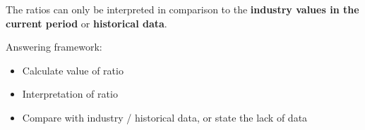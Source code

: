The ratios can only be interpreted in comparison to the \textbf{industry values in the current period} or \textbf{historical data}.

Answering framework:
\begin{itemize}
    \item Calculate value of ratio
    \item Interpretation of ratio
    \item Compare with industry / historical data, or state the lack of data
\end{itemize}
